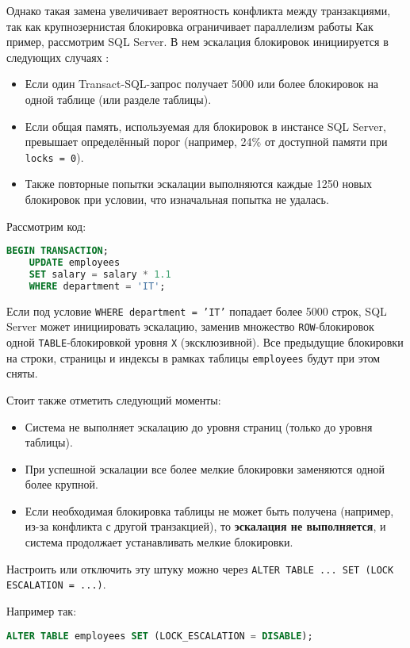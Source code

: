 Однако такая замена увеличивает вероятность конфликта между транзакциями, так как крупнозернистая блокировка ограничивает параллелизм работы \autocite{MicrosoftLearnSQLserverTransLock}
Как пример, рассмотрим SQL Server. В нем эскалация блокировок инициируется в следующих случаях \autocite{MicrosoftLearnSQLserverTransLock}:
\begin{itemize}
    \item Если один Transact-SQL-запрос получает 5000 или более блокировок на одной таблице (или разделе таблицы).
    \item Если общая память, используемая для блокировок в инстансе SQL Server, превышает определённый порог (например, 24\% от доступной памяти при \texttt{locks = 0}).
    \item Также повторные попытки эскалации выполняются каждые 1250 новых блокировок при условии, что изначальная попытка не удалась.
\end{itemize}

Рассмотрим код:
\begin{lstlisting}[language=SQL]
    BEGIN TRANSACTION;
    UPDATE employees
    SET salary = salary * 1.1
    WHERE department = 'IT';
\end{lstlisting}
Если под условие \texttt{WHERE department = 'IT'} попадает более 5000 строк, SQL Server может инициировать эскалацию, заменив множество \texttt{ROW}-блокировок одной \texttt{TABLE}-блокировкой уровня \texttt{X} (эксклюзивной). Все предыдущие блокировки на строки, страницы и индексы в рамках таблицы \texttt{employees} будут при этом сняты.

Стоит также отметить следующий моменты:
\begin{itemize}
    \item Система не выполняет эскалацию до уровня страниц (только до уровня таблицы).
    \item При успешной эскалации все более мелкие блокировки заменяются одной более крупной.
    \item Если необходимая блокировка таблицы не может быть получена (например, из-за конфликта с другой транзакцией), то \textbf{эскалация не выполняется}, и система продолжает устанавливать мелкие блокировки.
\end{itemize}

Настроить или отключить эту штуку можно через \texttt{ALTER TABLE ... SET (LOCK ESCALATION = ...)}.

Например так:
\begin{lstlisting}[language=SQL]
    ALTER TABLE employees SET (LOCK_ESCALATION = DISABLE);
\end{lstlisting}

